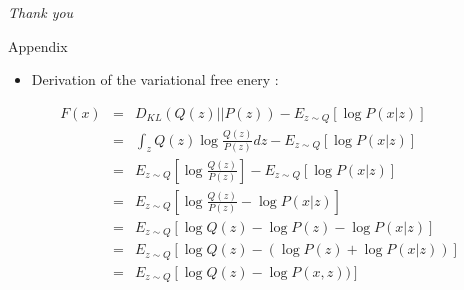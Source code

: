 \documentclass{beamer}
\begin{document}
\begin{frame}{}
  \centering \LARGE
  \emph{Thank you}
\end{frame}
\begin{frame}{Appendix}
\label{appendix}
    \begin{itemize}
        \item Derivation of the variational free enery :
    \end{itemize}
    \begin{eqnarray}
    F(x) &=& D_{KL}(Q(z) || P(z)) - E_{z \sim Q}[\log P(x|z)]\\
    &=& \int_{z} Q(z) \log \frac{Q(z)}{P(z)} dz - E_{z \sim Q}[\log P(x|z)]\\
    &=& E_{z \sim Q}[\log \frac{Q(z)}{P(z)}] - E_{z \sim Q}[\log P(x|z)]\\
    &=& E_{z \sim Q}[\log \frac{Q(z)}{P(z)} - \log P(x|z)]  \\
    &=& E_{z \sim Q}[\log Q(z) - \log P(z)  - \log P(x|z)]  \\
    &=& E_{z \sim Q}[\log Q(z) - (\log P(z)  + \log P(x|z))]\\
    &=& E_{z \sim Q}[\log Q(z) - \log P(x, z))]
    \end{eqnarray}
\end{frame}
\end{document}
